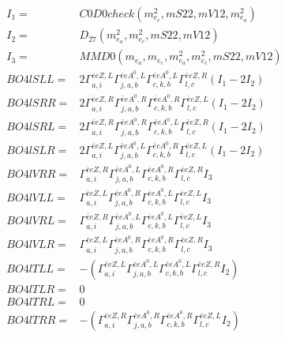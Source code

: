 \documentclass[A4,landscape]{article}
\begin{document}
\begin{align} 
I_1 = & C0D0check(m^2_{e_{{c}}}, mS22, mV12, m^2_{e_{{a}}}) \\ 
I_2 = & D_{27}(m^2_{e_{{a}}}, m^2_{e_{{c}}}, mS22, mV12) \\ 
I_3 = & MMD0(m_{e_{{a}}}, m_{e_{{c}}}, m^2_{e_{{a}}}, m^2_{e_{{c}}}, mS22, mV12) \\ 
  BO4lSLL= & 2  \Gamma^{\bar{e}e Z ,L}_{a, i} \Gamma^{\bar{e}e A^0 ,L}_{j, a, b} \Gamma^{\bar{e}e A^0 ,L}_{c, k, b} \Gamma^{\bar{e}e Z ,R}_{l, c} (I_1 - 2 I_2) \\ 
  BO4lSRR= & 2  \Gamma^{\bar{e}e Z ,R}_{a, i} \Gamma^{\bar{e}e A^0 ,R}_{j, a, b} \Gamma^{\bar{e}e A^0 ,R}_{c, k, b} \Gamma^{\bar{e}e Z ,L}_{l, c} (I_1 - 2 I_2) \\ 
  BO4lSRL= & 2  \Gamma^{\bar{e}e Z ,R}_{a, i} \Gamma^{\bar{e}e A^0 ,R}_{j, a, b} \Gamma^{\bar{e}e A^0 ,L}_{c, k, b} \Gamma^{\bar{e}e Z ,R}_{l, c} (I_1 - 2 I_2) \\ 
  BO4lSLR= & 2  \Gamma^{\bar{e}e Z ,L}_{a, i} \Gamma^{\bar{e}e A^0 ,L}_{j, a, b} \Gamma^{\bar{e}e A^0 ,R}_{c, k, b} \Gamma^{\bar{e}e Z ,L}_{l, c} (I_1 - 2 I_2) \\ 
  BO4lVRR= &  \Gamma^{\bar{e}e Z ,R}_{a, i} \Gamma^{\bar{e}e A^0 ,L}_{j, a, b} \Gamma^{\bar{e}e A^0 ,R}_{c, k, b} \Gamma^{\bar{e}e Z ,R}_{l, c} I_3 \\ 
  BO4lVLL= &  \Gamma^{\bar{e}e Z ,L}_{a, i} \Gamma^{\bar{e}e A^0 ,R}_{j, a, b} \Gamma^{\bar{e}e A^0 ,L}_{c, k, b} \Gamma^{\bar{e}e Z ,L}_{l, c} I_3 \\ 
  BO4lVRL= &  \Gamma^{\bar{e}e Z ,R}_{a, i} \Gamma^{\bar{e}e A^0 ,L}_{j, a, b} \Gamma^{\bar{e}e A^0 ,L}_{c, k, b} \Gamma^{\bar{e}e Z ,L}_{l, c} I_3 \\ 
  BO4lVLR= &  \Gamma^{\bar{e}e Z ,L}_{a, i} \Gamma^{\bar{e}e A^0 ,R}_{j, a, b} \Gamma^{\bar{e}e A^0 ,R}_{c, k, b} \Gamma^{\bar{e}e Z ,R}_{l, c} I_3 \\ 
  BO4lTLL= & -( \Gamma^{\bar{e}e Z ,L}_{a, i} \Gamma^{\bar{e}e A^0 ,L}_{j, a, b} \Gamma^{\bar{e}e A^0 ,L}_{c, k, b} \Gamma^{\bar{e}e Z ,R}_{l, c} I_2) \\ 
  BO4lTLR= & 0 \\ 
  BO4lTRL= & 0 \\ 
  BO4lTRR= & -( \Gamma^{\bar{e}e Z ,R}_{a, i} \Gamma^{\bar{e}e A^0 ,R}_{j, a, b} \Gamma^{\bar{e}e A^0 ,R}_{c, k, b} \Gamma^{\bar{e}e Z ,L}_{l, c} I_2) \\ 
\end{align} 
\end{document}
